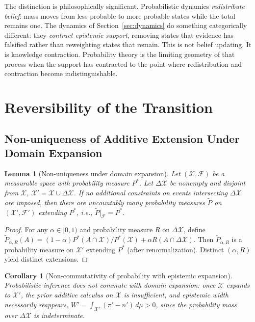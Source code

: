 \documentclass[12pt]{article}
\newtheorem{lemma}[theorem]{Lemma}
\newtheorem{corollary}[theorem]{Corollary}
\newcommand{\calF}{\mathcal{F}}
\newcommand{\calX}{\mathcal{X}}
\begin{document}
The distinction is philosophically significant. Probabilistic dynamics
\emph{redistribute belief}: mass moves from less probable to more probable states
while the total remains one. The dynamics of Section~\ref{sec:dynamics} do
something categorically different: they \emph{contract epistemic support}, removing
states that evidence has falsified rather than reweighting states that remain. This
is not belief updating. It is knowledge contraction. Probability theory is the
limiting geometry of that process when the support has contracted to the point
where redistribution and contraction become indistinguishable.

\section{Reversibility of the Transition}
\label{sec:reversibility}

\subsection{Non-uniqueness of Additive Extension Under Domain Expansion}

\begin{lemma}[Non-uniqueness under domain expansion]
\label{lem:non_unique}
Let $(\calX,\calF)$ be a measurable space with probability measure $P^*$.
Let $\Delta\calX$ be nonempty and disjoint from $\calX$,
$\calX'=\calX\cup\Delta\calX$.
If no additional constraints on events intersecting $\Delta\calX$ are imposed,
then there are uncountably many probability measures $\tilde{P}$ on
$(\calX',\calF')$ extending $P^*$, i.e., $\tilde{P}|_\calF = P^*$.
\end{lemma}

\begin{proof}
For any $\alpha\in[0,1)$ and probability measure $R$ on $\Delta\calX$,
define $\tilde{P}_{\alpha,R}(A) = (1-\alpha)P^*(A\cap\calX)/P^*(\calX) + \alpha R(A\cap\Delta\calX)$.
Then $\tilde{P}_{\alpha,R}$ is a probability measure on $\calX'$ extending $P^*$
(after renormalization).
Distinct $(\alpha,R)$ yield distinct extensions.
\end{proof}

\begin{corollary}[Non-commutativity of probability with epistemic expansion]
Probabilistic inference does not commute with domain expansion:
once $\calX$ expands to $\calX'$, the prior additive calculus on $\calX$
is insufficient, and epistemic width necessarily reappears,
$W' = \int_{\calX'}(\pi'-n')\,d\mu > 0$,
since the probability mass over $\Delta\calX$ is indeterminate.
\end{corollary}
\end{document}

